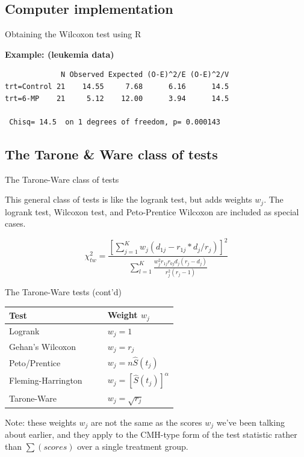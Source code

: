 \documentclass[envcountsect, 10pt, portrait, palatino]{beamer}
\begin{document}
\subsection{Computer implementation}
\begin{frame}[fragile]{Obtaining the Wilcoxon test using R}

{ \bf Example: (leukemia data)}
\begin{verbatim}
             N Observed Expected (O-E)^2/E (O-E)^2/V
trt=Control 21    14.55     7.68      6.16      14.5
trt=6-MP    21     5.12    12.00      3.94      14.5

 Chisq= 14.5  on 1 degrees of freedom, p= 0.000143
\end{verbatim}
\end{frame}

\subsection{The Tarone \& Ware class of tests}
\begin{frame}{The Tarone-Ware class of tests}

This general class of tests is like the logrank test, but
adds weights $w_j$.  The logrank test, Wilcoxon test, and
Peto-Prentice Wilcoxon are included as special cases.

\[ \chi^2_{tw} = \frac{[\sum_{j=1}^K w_j (d_{1j} - r_{1j}*d_j/r_j)]^2}
        {\sum_{l=1}^K \frac{w_j^2 r_{1j}r_{0j}d_j(r_j-d_j)}{r_j^2(r_j-1)}}  \]
\end{frame}

\begin{frame}{The Tarone-Ware tests (cont'd)}

\begin{center}
\begin{tabular}{ll}
\hline \hline
{\bf Test} & {\bf Weight $w_j$} \\ \hline
Logrank              &  $w_j = 1$\\[2ex]
Gehan's Wilcoxon     &  $w_j = r_j$\\[2ex]
Peto/Prentice        &  $w_j = n \widehat{S}(t_j)$\\[2ex]
Fleming-Harrington~~~~   &  $w_j=[\hat{S}(t_j)]^\alpha$\\[2ex]
Tarone-Ware          &  $w_j=\sqrt{r_j}$\\
\hline \hline
\end{tabular}
\end{center}

Note:  these weights $w_j$ are not the same as the scores $w_j$
we've been talking about earlier, and they apply to the CMH-type
form of the test statistic rather than $\sum (scores)$ over
a single treatment group.
\end{frame}
\end{document}
